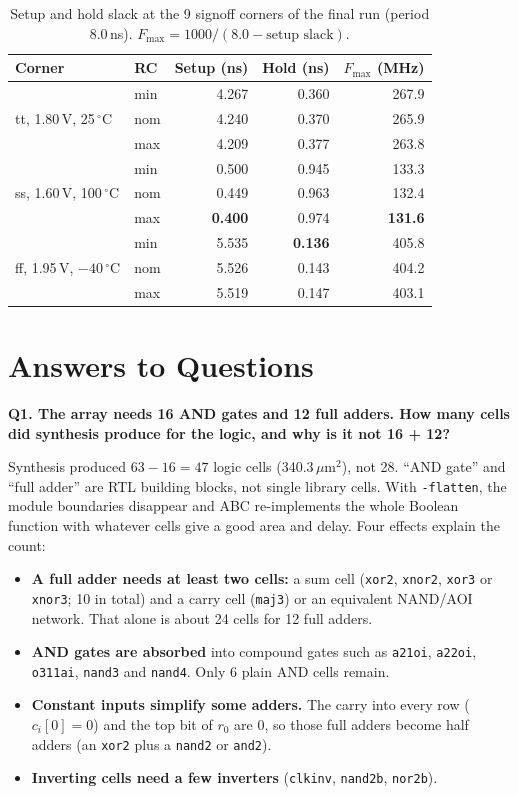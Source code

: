 \documentclass[10pt,a4paper,twocolumn]{article}
\newcommand{\umsq}{\,$\mu$m$^2$}
\newcommand{\Fmax}{$F_{\max}$}
\newcommand{\q}[1]{\par\smallskip\noindent\textbf{#1}\par}
\begin{document}
\begin{table}[!htbp]
\centering\footnotesize
\begin{tabular}{llrrr}
\toprule
\textbf{Corner} & \textbf{RC} & \textbf{Setup (ns)} & \textbf{Hold (ns)} & \textbf{\Fmax{} (MHz)} \\
\midrule
\multirow{3}{*}{tt, 1.80\,V, 25\,$^\circ$C} & min & 4.267 & 0.360 & 267.9 \\
 & nom & 4.240 & 0.370 & 265.9 \\
 & max & 4.209 & 0.377 & 263.8 \\
\midrule
\multirow{3}{*}{ss, 1.60\,V, 100\,$^\circ$C} & min & 0.500 & 0.945 & 133.3 \\
 & nom & 0.449 & 0.963 & 132.4 \\
 & max & \textbf{0.400} & 0.974 & \textbf{131.6} \\
\midrule
\multirow{3}{*}{ff, 1.95\,V, $-40$\,$^\circ$C} & min & 5.535 & \textbf{0.136} & 405.8 \\
 & nom & 5.526 & 0.143 & 404.2 \\
 & max & 5.519 & 0.147 & 403.1 \\
\bottomrule
\end{tabular}
\caption{Setup and hold slack at the 9 signoff corners of the final run (period 8.0\,ns). $F_{\max} = 1000/(8.0 - \text{setup slack})$.}
\label{tab:corners}
\end{table}

\section{Answers to Questions}

\q{Q1. The array needs 16 AND gates and 12 full adders. How many cells did synthesis produce for the logic, and why is it not 16 + 12?}
Synthesis produced $63 - 16 = 47$ logic cells (340.3\umsq), not 28. ``AND gate'' and ``full adder'' are RTL building blocks, not single library cells. With \texttt{-flatten}, the module boundaries disappear and ABC re-implements the whole Boolean function with whatever cells give a good area and delay. Four effects explain the count:
\begin{itemize}
  \item \textbf{A full adder needs at least two cells:} a sum cell (\texttt{xor2}, \texttt{xnor2}, \texttt{xor3} or \texttt{xnor3}; 10 in total) and a carry cell (\texttt{maj3}) or an equivalent NAND/AOI network. That alone is about 24 cells for 12 full adders.
  \item \textbf{AND gates are absorbed} into compound gates such as \texttt{a21oi}, \texttt{a22oi}, \texttt{o311ai}, \texttt{nand3} and \texttt{nand4}. Only 6 plain AND cells remain.
  \item \textbf{Constant inputs simplify some adders.} The carry into every row ($c_i[0] = 0$) and the top bit of $r_0$ are 0, so those full adders become half adders (an \texttt{xor2} plus a \texttt{nand2} or \texttt{and2}).
  \item \textbf{Inverting cells need a few inverters} (\texttt{clkinv}, \texttt{nand2b}, \texttt{nor2b}).
\end{itemize}
\end{document}
